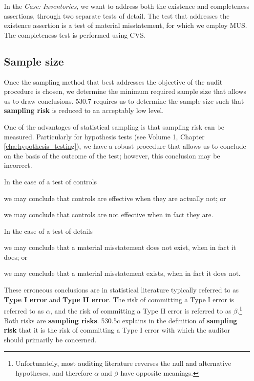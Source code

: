 In the \emph{Case: Inventories}, we want to address both the existence and completeness assertions, through two separate tests of detail. The test that addresses the existence assertion is a test of material misstatement, for which we employ MUS. The completeness test is performed using CVS.


\subsection{Sample size} %
\label{sub:sample_size}

Once the sampling method that best addresses the objective of the audit procedure is chosen, we determine the minimum required sample size that allows us to draw conclusions. 530.7 requires us to determine the sample size such that \textbf{sampling risk} is reduced to an acceptably low level. 

One of the advantages of statistical sampling is that sampling risk can be measured. Particularly for hypothesis tests (see Volume 1, Chapter \ref{cha:hypothesis_testing}), we have a robust procedure that allows us to conclude on the basis of the outcome of the test; however, this conclusion may be incorrect. 

\bigskip
In the case of a test of controls
\begin{compactitem}
\item we may conclude that controls are effective when they are actually not; or
\item we may conclude that controls are not effective when in fact they are.
\end{compactitem}

\bigskip
In the case of a test of details
\begin{compactitem}
\item we may conclude that a material misstatement does not exist, when in fact it does; or
\item we may conclude that a material misstatement exists, when in fact it does not.
\end{compactitem}

\bigskip
These erroneous conclusions are in statistical literature typically referred to as \textbf{Type I error} and \textbf{Type II error}. The risk of committing a Type I error is referred to as $\alpha$, and the risk of committing a Type II error is referred to as $\beta$.\footnote{Unfortunately, most auditing literature reverses the null and alternative hypotheses, and therefore $\alpha$ and $\beta$ have opposite meanings.} Both risks are \textbf{sampling risks}. 530.5c explains in the definition of \textbf{sampling risk} that it is the risk of committing a Type I error with which the auditor should primarily be concerned.

